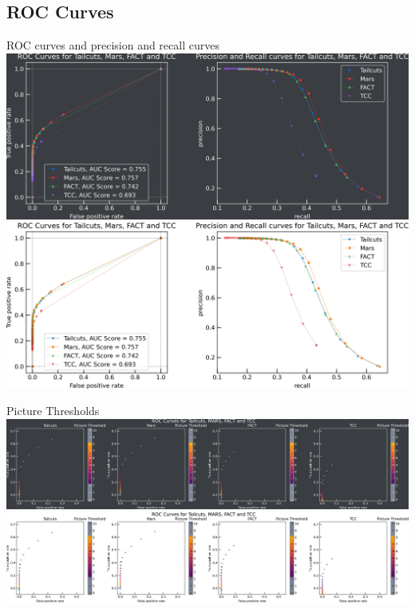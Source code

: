 \subsection{ROC Curves}
\begin{frame}{ROC curves and precision and recall curves}
  \ifdefined\darktheme
    \centering
    \includegraphics[width=\textwidth]{plots/roc_prec_rec_duo_dark.png}
  \else
    \centering
    \includegraphics[width=\textwidth]{plots/roc_prec_rec_duo_light.png}
  \fi
\end{frame}
\begin{frame}{Picture Thresholds}
  \ifdefined\darktheme
    \centering
    \includegraphics[width=\textwidth]{plots/pic_thresh_roc_dark.png}
  \else
    \centering
    \includegraphics[width=\textwidth]{plots/pic_thresh_roc_light.png}
  \fi
\end{frame}

